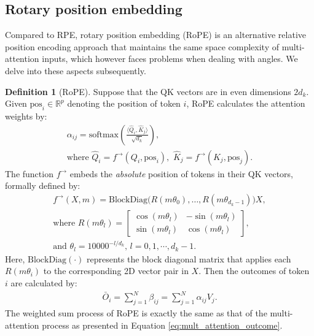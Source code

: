 \documentclass[lettersize,journal]{IEEEtran}
\theoremstyle{definition}
\newtheorem{definition}{Definition}
\begin{document}
\subsection{Rotary position embedding}
Compared to RPE, rotary position embedding (RoPE) is an alternative relative position encoding approach that maintains the same space complexity of multi-attention inputs, which however faces problems when dealing with angles.
We delve into these aspects subsequently.
\begin{definition}[RoPE]
\label{def:RoPE}
Suppose that the QK vectors are in even dimensions $2d_k$.
Given $\text{pos}_i\in \mathbb{R}^{p}$ denoting the position of token $i$, RoPE calculates the attention weights by:
\begin{gather}
    \alpha_{ij} = \mathrm{softmax} \left(
  \frac{ \langle \hat{Q}_i, \hat{K}_j \rangle}{\sqrt{d_k}}
\right), \label{eq:RoPE_attention}\\
\text{where } \hat{Q}_i = f^{\rightarrow}(Q_i, \text{pos}_i),\,\,
\hat{K}_j = f^{\rightarrow}(K_j, \text{pos}_j).
\label{eq:absolute_pos_emb}
\end{gather}
The function $f^{\rightarrow}$ embeds the \textit{absolute} position of tokens in their QK vectors, formally defined by:
\begin{gather}
    f^{\rightarrow}(X,m) = \text{BlockDiag} \big( R(m\theta_0), \dots, R(m\theta_{d_k -1}) \big) X, \label{eq:block_diag}\\
    \text{where } R(m\theta_l) = \begin{bmatrix} \cos(m\theta_l) & -\sin(m\theta_l) \\ \sin(m\theta_l) & \cos(m\theta_l) \end{bmatrix}, \label{eq:R}\\
    \text{and } \theta_l = 10000^{-l/d_k},  \,  l=0,1,\cdots,d_k-1. \label{eq:theta_l}
\end{gather}
Here, \( \text{BlockDiag}(\cdot) \) represents the block diagonal matrix that applies each \( R(m\theta_i) \) to the corresponding 2D vector pair in \( X \).
Then the outcomes of token $i$ are calculated by:
\begin{gather}
    \bar{O}_i = \sum_{j=1}^N \beta_{ij} = \sum_{j=1}^{N} \alpha_{ij} V_{j}.
    \label{eq:RoPE_weighted_sum}
\end{gather}
The weighted sum process of RoPE is exactly the same as that of the multi-attention process as presented in Equation \eqref{eq:mult_attention_outcome}.
\end{definition}
\end{document}
